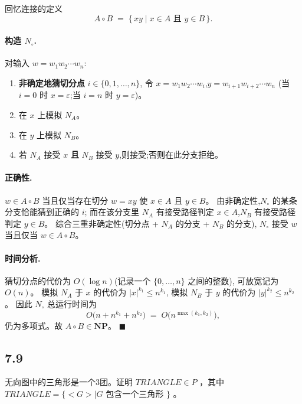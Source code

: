 \begin{answerred}
回忆连接的定义
\[
    A \circ B \;=\; \{\, xy \mid x \in A \text{ 且 } y \in B \,\}.
\]
 
\paragraph{构造 $N_\circ$.} 对输入 $w = w_1 w_2 \cdots w_n$:
\begin{enumerate}
    \item \textbf{非确定地猜切分点} $i \in \{0, 1, \ldots, n\}$,
          令 $x = w_1 w_2 \cdots w_i$,$y = w_{i+1} w_{i+2} \cdots w_n$
          (当 $i = 0$ 时 $x = \varepsilon$;当 $i = n$ 时 $y = \varepsilon$)。
    \item 在 $x$ 上模拟 $N_A$。
    \item 在 $y$ 上模拟 $N_B$。
    \item 若 $N_A$ 接受 $x$ \textbf{且} $N_B$ 接受 $y$,则接受;否则在此分支拒绝。
\end{enumerate}
 
\paragraph{正确性.}
$w \in A \circ B$ 当且仅当存在切分 $w = xy$ 使 $x \in A$ 且 $y \in B$。
由非确定性,$N_\circ$ 的某条分支恰能猜到正确的 $i$;
而在该分支里 $N_A$ 有接受路径判定 $x \in A$,$N_B$ 有接受路径判定 $y \in B$。
综合三重非确定性(切分点 + $N_A$ 的分支 + $N_B$ 的分支),
$N_\circ$ 接受 $w$ 当且仅当 $w \in A \circ B$。
 
\paragraph{时间分析.}
猜切分点的代价为 $O(\log n)$(记录一个 $\{0, \ldots, n\}$ 之间的整数),
可放宽记为 $O(n)$。
模拟 $N_A$ 于 $x$ 的代价为 $|x|^{k_1} \leq n^{k_1}$,
模拟 $N_B$ 于 $y$ 的代价为 $|y|^{k_2} \leq n^{k_2}$。
因此 $N_\circ$ 总运行时间为
\[
    O\bigl(n + n^{k_1} + n^{k_2}\bigr) \;=\; O\bigl(n^{\max(k_1, k_2)}\bigr),
\]
仍为多项式。故 $A \circ B \in \mathbf{NP}$。
\hfill$\blacksquare$

\end{answerred}
\subsection*{7.9}

无向图中的三角形是一个3团。证明 $TRIANGLE \in P$ ，其中 $TRIANGLE=\{<G>|G$ 包含一个三角形 $\}$ 。

